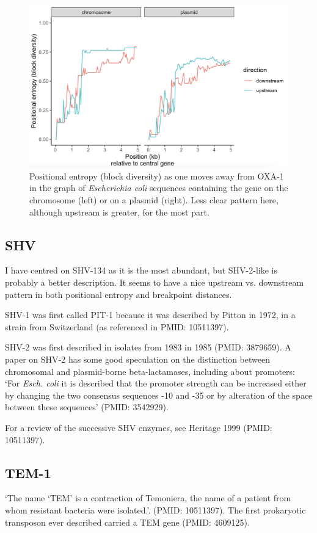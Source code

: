 \documentclass[aps,rmp,preprint,superscriptaddress,10pt,twocolumn]{revtex4-1}
\begin{document}
\begin{figure}
    \centering
\includegraphics[width=0.5\linewidth]{figs/OXA-1-ecoli-positional-entropy.png}
    \caption{Positional entropy (block diversity) as one moves away from OXA-1 in the graph of \textit{Escherichia coli} sequences containing the gene on the chromosome (left) or on a plasmid (right). Less clear pattern here, although upstream is greater, for the most part.}
    \label{fig:OXA-1-ecoli-positional-entropy}
\end{figure}


\subsection{SHV}

I have centred on SHV-134 as it is the most abundant, but SHV-2-like is probably a better description. It seems to have a nice upstream vs. downstream pattern in both positional entropy and breakpoint distances. 

SHV-1 was first called PIT-1 because it was described by Pitton in 1972, in a strain from Switzerland (as referenced in PMID: 10511397). 

SHV-2 was first described in isolates from 1983 in 1985 (PMID: 3879659). A paper on SHV-2 has some good speculation on the distinction between chromosomal and plasmid-borne beta-lactamases, including about promoters: `For \textit{Esch. coli} it is described that the promoter strength can be increased either by changing the two consensus sequences -10 and -35 or by alteration of the space between these sequences' (PMID: 3542929). 

For a review of the successive SHV enzymes, see Heritage 1999 (PMID: 10511397). 



\subsection{TEM-1}

`The name ‘TEM’ is a contraction of Temoniera, the name of a patient from whom resistant bacteria were isolated.'. (PMID: 10511397). The first prokaryotic transposon ever described carried a TEM gene (PMID: 4609125). 
\end{document}
